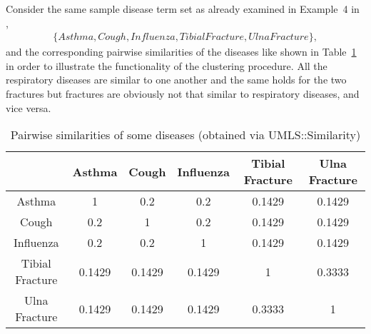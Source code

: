 \begin{exmp}
\label{sec:impl_clust_exmp}

Consider the same sample disease term set as already examined in Example~4 in \cite{Wiese2014},
\begin{align*}
    \{Asthma, Cough, Influenza, Tibial Fracture, Ulna Fracture\},
\end{align*}
and the corresponding pairwise similarities of the diseases like shown in Table~\ref{tab:impl_similarities} in order to illustrate the functionality of the 
clustering procedure. All the respiratory diseases are similar to one another and the same holds for the two fractures but fractures are obviously not that
similar to respiratory diseases, and vice versa.

\begin{table}[h]
    \centering
    \begin{tabular}{|c|c c c c c|}
        \hline
         & Asthma & Cough & Influenza & Tibial Fracture & Ulna Fracture \\
        \hline
        Asthma & 1 & 0.2 & 0.2 & 0.1429 & 0.1429 \\
        Cough & 0.2 & 1 & 0.2 & 0.1429 & 0.1429 \\
        Influenza & 0.2 & 0.2 & 1 & 0.1429 & 0.1429 \\
        Tibial Fracture & 0.1429 & 0.1429 & 0.1429 & 1 & 0.3333 \\
        Ulna Fracture & 0.1429 & 0.1429 & 0.1429 & 0.3333 & 1 \\
        \hline
    \end{tabular}
    \caption{Pairwise similarities of some diseases (obtained via UMLS::Similarity)}
    \label{tab:impl_similarities}
\end{table}


\end{exmp}

